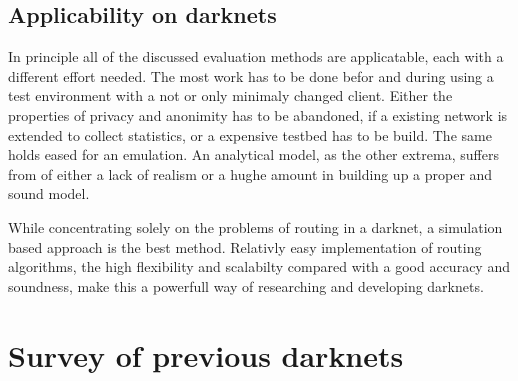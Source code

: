 \subsection{Applicability on darknets}

In principle all of the discussed evaluation methods are applicatable, each with a different effort needed. The most work has to be done befor and during using a test environment with a not or only minimaly changed client. Either the properties of privacy and anonimity has to be abandoned, if a existing network is extended to collect statistics, or a expensive testbed has to be build. The same holds eased for an emulation. An analytical model, as the other extrema, suffers from of either a lack of realism or a hughe amount in building up a proper and sound model.

While concentrating solely on the problems of routing in a darknet, a simulation based approach is the best method. Relativly easy implementation of routing algorithms, the high flexibility and scalabilty compared with a good accuracy and soundness, make this a powerfull way of researching and developing darknets.

\section{Survey of previous darknets}



